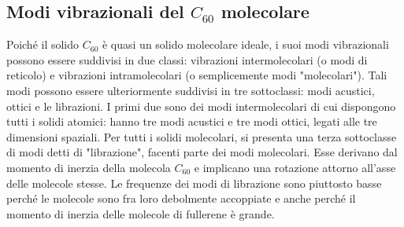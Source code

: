 \documentclass[a4paper,titlepage]{book}
\begin{document}
\subsection{Modi vibrazionali del $C_{60}$ molecolare}
Poiché il solido $C_{60}$ è quasi un solido molecolare ideale, i suoi modi vibrazionali possono essere suddivisi in due classi: vibrazioni intermolecolari (o modi di reticolo) e vibrazioni intramolecolari (o semplicemente modi "molecolari"). Tali modi possono essere ulteriormente suddivisi in tre sottoclassi: modi acustici, ottici e le librazioni. I primi due sono dei modi intermolecolari di cui dispongono tutti i solidi atomici: hanno tre modi acustici e tre modi ottici, legati alle tre dimensioni spaziali. Per tutti i solidi molecolari, si presenta una terza sottoclasse di modi detti di "librazione", facenti parte dei modi molecolari. Esse derivano dal momento di inerzia della molecola $C_{60}$ e implicano una rotazione attorno all'asse delle molecole stesse. Le frequenze dei modi di librazione sono piuttosto basse perché le molecole sono fra loro debolmente accoppiate e anche perché il momento di inerzia delle molecole di fullerene è grande.\\
\end{document}

